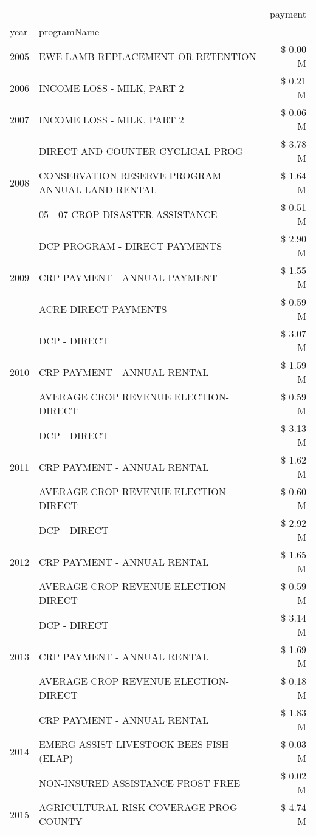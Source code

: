 \begin{tabular}{llr}
\toprule
 &  & payment \\
year & programName &  \\
\midrule
2005 & EWE LAMB REPLACEMENT OR RETENTION & \$ 0.00 M \\
\cline{1-3}
2006 & INCOME LOSS - MILK, PART 2 & \$ 0.21 M \\
\cline{1-3}
2007 & INCOME LOSS - MILK, PART 2 & \$ 0.06 M \\
\cline{1-3}
\multirow[t]{3}{*}{2008} & DIRECT AND COUNTER CYCLICAL PROG & \$ 3.78 M \\
 & CONSERVATION RESERVE PROGRAM - ANNUAL LAND RENTAL & \$ 1.64 M \\
 & 05 - 07 CROP DISASTER ASSISTANCE & \$ 0.51 M \\
\cline{1-3}
\multirow[t]{3}{*}{2009} & DCP PROGRAM - DIRECT PAYMENTS & \$ 2.90 M \\
 & CRP PAYMENT - ANNUAL PAYMENT & \$ 1.55 M \\
 & ACRE DIRECT PAYMENTS & \$ 0.59 M \\
\cline{1-3}
\multirow[t]{3}{*}{2010} & DCP - DIRECT & \$ 3.07 M \\
 & CRP PAYMENT - ANNUAL RENTAL & \$ 1.59 M \\
 & AVERAGE CROP REVENUE ELECTION-DIRECT & \$ 0.59 M \\
\cline{1-3}
\multirow[t]{3}{*}{2011} & DCP - DIRECT & \$ 3.13 M \\
 & CRP PAYMENT - ANNUAL RENTAL & \$ 1.62 M \\
 & AVERAGE CROP REVENUE ELECTION-DIRECT & \$ 0.60 M \\
\cline{1-3}
\multirow[t]{3}{*}{2012} & DCP - DIRECT & \$ 2.92 M \\
 & CRP PAYMENT - ANNUAL RENTAL & \$ 1.65 M \\
 & AVERAGE CROP REVENUE ELECTION-DIRECT & \$ 0.59 M \\
\cline{1-3}
\multirow[t]{3}{*}{2013} & DCP - DIRECT & \$ 3.14 M \\
 & CRP PAYMENT - ANNUAL RENTAL & \$ 1.69 M \\
 & AVERAGE CROP REVENUE ELECTION-DIRECT & \$ 0.18 M \\
\cline{1-3}
\multirow[t]{3}{*}{2014} & CRP PAYMENT - ANNUAL RENTAL & \$ 1.83 M \\
 & EMERG ASSIST LIVESTOCK BEES FISH (ELAP) & \$ 0.03 M \\
 & NON-INSURED ASSISTANCE FROST FREE & \$ 0.02 M \\
\cline{1-3}
\multirow[t]{3}{*}{2015} & AGRICULTURAL RISK COVERAGE PROG - COUNTY & \$ 4.74 M \\

\end{tabular}
